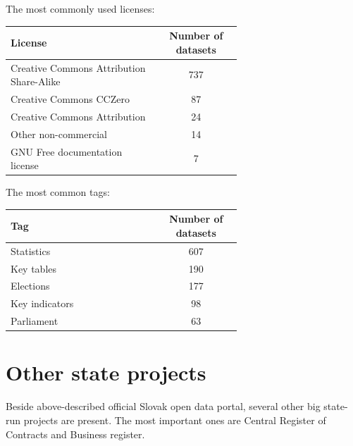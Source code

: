\documentclass[thesis=B,english]{FITthesis}[2012/06/26]
\begin{document}
    \vspace{20px}
    The most commonly used licenses:
    \begin{center}
        \begin{tabular}{  p{0.65\linewidth} | c }
        \textbf{License} & \textbf{Number of datasets} \\ \hline
        Creative Commons Attribution Share-Alike & 737 \\
        Creative Commons CCZero & 87 \\
        Creative Commons Attribution & 24 \\
        Other non-commercial & 14 \\
        GNU Free documentation license & 7 \\
        \end{tabular}
    \end{center}
    \vspace{20px}
    The most common tags:
    \begin{center}
        \begin{tabular}{  p{0.65\linewidth} | c }
        \textbf{Tag} & \textbf{Number of datasets} \\ \hline
        Statistics & 607 \\
        Key tables & 190 \\
        Elections & 177 \\
        Key indicators & 98 \\
        Parliament & 63 \\
        \end{tabular}
    \end{center}
    \section{Other state projects}
    Beside above-described official Slovak open data portal, several other big state-run projects are present. The most important ones are Central Register of Contracts and Business register.
\end{document}
